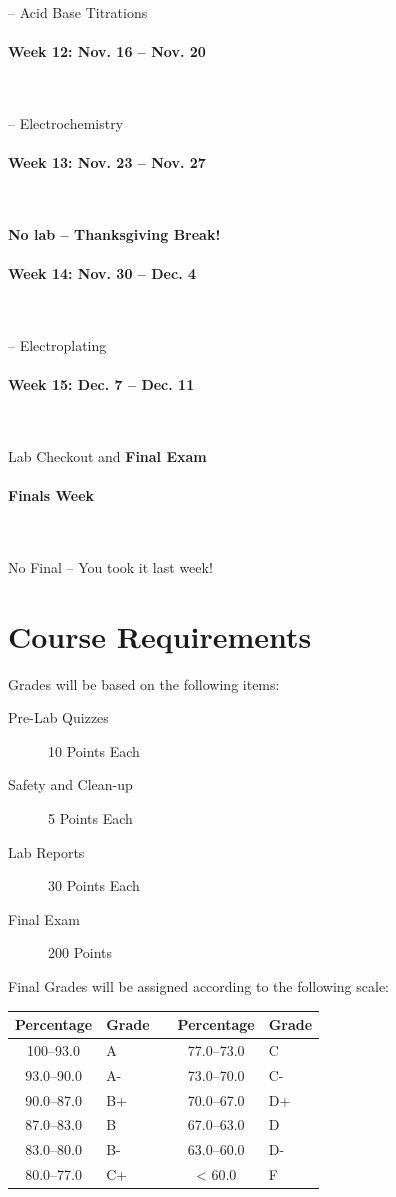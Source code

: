 \documentclass[12pt, letterpaper]{article}
\begin{document}
-- Acid Base Titrations

\paragraph{Week 12: Nov. 16 -- Nov. 20}~

-- Electrochemistry

\paragraph{Week 13: Nov. 23 -- Nov. 27}~

\textbf{No lab -- Thanksgiving Break!}

\paragraph{Week 14: Nov. 30 -- Dec. 4}~

-- Electroplating

\paragraph{Week 15: Dec. 7 -- Dec. 11}~

Lab Checkout and \textbf{Final Exam}

\paragraph{Finals Week}~

No Final -- You took it last week!

\section*{Course Requirements}
Grades will be based on the following items:
\begin{description}
	\item[Pre-Lab Quizzes] 10 Points Each
	\item[Safety and Clean-up] 5 Points Each
	\item[Lab Reports] 30 Points Each
	\item[Final Exam] 200 Points
\end{description}
Final Grades will be assigned according to the following scale:

\begin{tabular}{cl|c|cl}
	Percentage & Grade &  & Percentage & Grade \\ \midrule
	100--93.0  & A     &  & 77.0--73.0 & C     \\
	93.0--90.0 & A-    &  & 73.0--70.0 & C-    \\
	90.0--87.0 & B+    &  & 70.0--67.0 & D+    \\
	87.0--83.0 & B     &  & 67.0--63.0 & D     \\
	83.0--80.0 & B-    &  & 63.0--60.0 & D-    \\
	80.0--77.0 & C+    &  & < 60.0     & F
\end{tabular}
\end{document}

